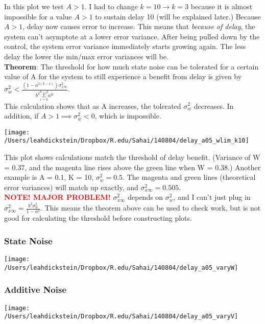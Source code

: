 \documentclass[leqno,twocolumn]{article}
\begin{document}
In this plot we test $A > 1$. I had to change $k = 10 \rightarrow k = 3$ because it is almost impossible for a value $ A > 1$ to sustain delay 10 (will be explained later.) Because $A > 1$, delay now causes error to increase. This means that \textit{because of delay}, the system can't asymptote at a lower error variance. After being pulled down by the control, the system error variance immediately starts growing again. The less delay the lower the min/max error variances will be.\\

\textbf{Theorem}: The threshold for how much state noise can be tolerated for a certain value of A for the system to still experience a benefit from delay is given by $\sigma_w^2 < \frac{(1-a^{2(k-1)})\sigma^2_{x\infty}}{b^2 \overset{k-2}{\underset{i=0}{\Sigma}} a^{2i}}$.\\

This calculation shows that as A increases, the tolerated $\sigma_w^2$ decreases. In addition, if $A > 1 \implies \sigma_w^2 < 0$, which is impossible.

\begin{center}
\texttt{[image: /Users/leahdickstein/Dropbox/R.edu/Sahai/140804/delay\_a05\_wlim\_k10]}\end{center}

This plot shows calculations match the threshold of delay benefit. (Variance of W = 0.37, and the magenta line rises above the green line when W = 0.38.) Another example is A = 0.1, K = 10, $\sigma_w^2 = 0.5$. The magenta and green lines (theoretical error variances) will match up exactly, and $\sigma_{x\infty}^2 = 0.505$.\\

\textcolor{red}{\textbf{NOTE! MAJOR PROBLEM!}} $\sigma^2_{x\infty}$ depends on $\sigma_w^2$, and I can't just plug in $\sigma^2_{x\infty} = \frac{b^2\sigma_w^2}{1-a^2}$. This means the theorem above can be used to check work, but is not good for calculating the threshold before constructing plots.

\subsubsection{State Noise}
\begin{center}
\texttt{[image: /Users/leahdickstein/Dropbox/R.edu/Sahai/140804/delay\_a05\_varyW]}\end{center}

\subsubsection{Additive Noise}
\begin{center}
\texttt{[image: /Users/leahdickstein/Dropbox/R.edu/Sahai/140804/delay\_a05\_varyV]}\end{center}
\end{document}
